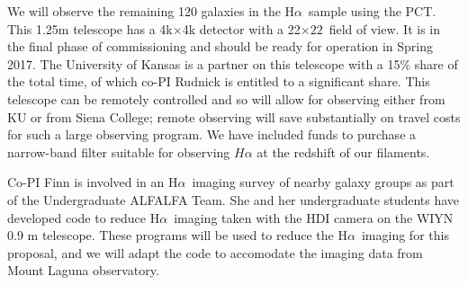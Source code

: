 \documentclass[11pt, preprint]{aastex}
\newcommand{\ha}{H$\alpha$}
\begin{document}
We will observe the remaining 120 galaxies in the \ha \ sample using the
PCT.  This 1.25m telescope has a 4k$\times$4k detector with a  22\arcmin$\times
22$\arcmin \ field of view.  It is in the final phase of commissioning
and should be ready for operation in Spring 2017.  The University of
Kansas is a partner on this telescope with a 15\% share of the total
time, of which co-PI Rudnick is entitled to a significant share.  This
telescope can be remotely controlled and so will allow for observing
either from KU or from Siena College; remote observing will save substantially on travel costs for such a large observing program.
We have included funds to purchase a narrow-band filter suitable for observing $H\alpha$  at the redshift of our filaments.  


Co-PI Finn is involved in an \ha \ imaging survey of nearby galaxy groups
as part of the Undergraduate ALFALFA Team.  She and her undergraduate
students have developed code to reduce \ha \ imaging taken with the HDI camera on
the WIYN 0.9 m telescope.  These programs will be used to reduce the
\ha \ imaging for this proposal, and we will adapt the code to
accomodate the imaging data from Mount Laguna observatory.

\end{document}
